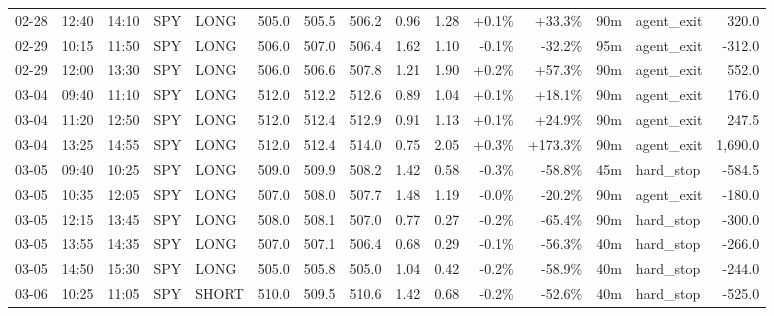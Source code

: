 \documentclass[11pt,a4paper,twoside]{article}
\begin{document}
\begin{landscape}
\begin{center}
\begin{longtable}{>{\color{txtmain}}l l l l l r r r r r r r r >{\color{txtmain}}l r}
02-28 & 12:40 & 14:10 & SPY & LONG & 505.0 & 505.5 & 506.2 & 0.96 & 1.28 & \textcolor{wingreen}{+0.1\%} & \textcolor{wingreen}{+33.3\%} & 90m & agent\_exit & \textcolor{wingreen}{320.0} \\
02-29 & 10:15 & 11:50 & SPY & LONG & 506.0 & 507.0 & 506.4 & 1.62 & 1.10 & \textcolor{lossred}{-0.1\%} & \textcolor{lossred}{-32.2\%} & 95m & agent\_exit & \textcolor{lossred}{-312.0} \\
02-29 & 12:00 & 13:30 & SPY & LONG & 506.0 & 506.6 & 507.8 & 1.21 & 1.90 & \textcolor{wingreen}{+0.2\%} & \textcolor{wingreen}{+57.3\%} & 90m & agent\_exit & \textcolor{wingreen}{552.0} \\
03-04 & 09:40 & 11:10 & SPY & LONG & 512.0 & 512.2 & 512.6 & 0.89 & 1.04 & \textcolor{wingreen}{+0.1\%} & \textcolor{wingreen}{+18.1\%} & 90m & agent\_exit & \textcolor{wingreen}{176.0} \\
03-04 & 11:20 & 12:50 & SPY & LONG & 512.0 & 512.4 & 512.9 & 0.91 & 1.13 & \textcolor{wingreen}{+0.1\%} & \textcolor{wingreen}{+24.9\%} & 90m & agent\_exit & \textcolor{wingreen}{247.5} \\
03-04 & 13:25 & 14:55 & SPY & LONG & 512.0 & 512.4 & 514.0 & 0.75 & 2.05 & \textcolor{wingreen}{+0.3\%} & \textcolor{wingreen}{+173.3\%} & 90m & agent\_exit & \textcolor{wingreen}{1,690.0} \\
03-05 & 09:40 & 10:25 & SPY & LONG & 509.0 & 509.9 & 508.2 & 1.42 & 0.58 & \textcolor{lossred}{-0.3\%} & \textcolor{lossred}{-58.8\%} & 45m & hard\_stop & \textcolor{lossred}{-584.5} \\
03-05 & 10:35 & 12:05 & SPY & LONG & 507.0 & 508.0 & 507.7 & 1.48 & 1.19 & \textcolor{lossred}{-0.0\%} & \textcolor{lossred}{-20.2\%} & 90m & agent\_exit & \textcolor{lossred}{-180.0} \\
03-05 & 12:15 & 13:45 & SPY & LONG & 508.0 & 508.1 & 507.0 & 0.77 & 0.27 & \textcolor{lossred}{-0.2\%} & \textcolor{lossred}{-65.4\%} & 90m & hard\_stop & \textcolor{lossred}{-300.0} \\
03-05 & 13:55 & 14:35 & SPY & LONG & 507.0 & 507.1 & 506.4 & 0.68 & 0.29 & \textcolor{lossred}{-0.1\%} & \textcolor{lossred}{-56.3\%} & 40m & hard\_stop & \textcolor{lossred}{-266.0} \\
03-05 & 14:50 & 15:30 & SPY & LONG & 505.0 & 505.8 & 505.0 & 1.04 & 0.42 & \textcolor{lossred}{-0.2\%} & \textcolor{lossred}{-58.9\%} & 40m & hard\_stop & \textcolor{lossred}{-244.0} \\
03-06 & 10:25 & 11:05 & SPY & SHORT & 510.0 & 509.5 & 510.6 & 1.42 & 0.68 & \textcolor{lossred}{-0.2\%} & \textcolor{lossred}{-52.6\%} & 40m & hard\_stop & \textcolor{lossred}{-525.0} \\

\end{longtable}
\end{center}
\end{landscape}
\end{document}
